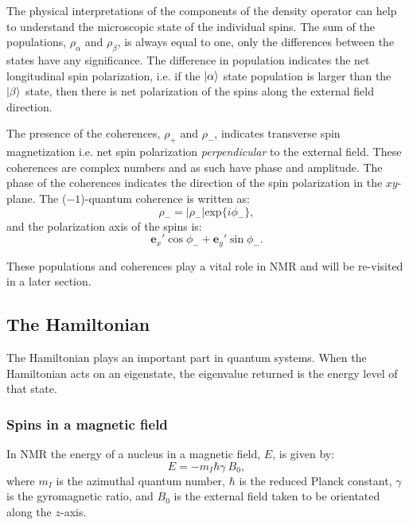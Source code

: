 The physical interpretations of the components of the density operator can help to understand the microscopic state
of the individual spins. The sum of the populations, $\rho_\alpha$ and $\rho_\beta$, is always equal to one, only the differences between the states
have any significance. The difference in population indicates the net longitudinal spin polarization, i.e. if the
$\ket{\alpha}$ state population is larger than the $\ket{\beta}$ state, then there is net polarization of the spins
along the external field direction.

The presence of the coherences, $\rho_+$ and $\rho_-$, indicates transverse spin magnetization i.e. net spin
polarization \textit{perpendicular} to the external field. These coherences are complex numbers and as
such have phase and amplitude. The phase of the coherences indicates the direction of the spin polarization
in the $xy$-plane. The ($-1$)-quantum coherence is written as:
\begin{equation}
  \rho_-= |\rho_-|\text{exp}\{i\phi_-\},
\end{equation}
and the polarization  axis of the spins is:
\begin{equation}
  \mathbf{e}_x'\cos\phi_- + \mathbf{e}_y'\sin\phi_-.
\end{equation}

These populations and coherences play a vital role in NMR and will be re-visited in a later section.

\newpage

\subsection{The Hamiltonian}\label{Hamiltonian}

The Hamiltonian plays an important part in quantum systems. When the Hamiltonian acts on an eigenstate,
the eigenvalue returned is the energy level of that state.

\subsubsection{Spins in a magnetic field}\label{EnergyLevels}

In NMR the energy of a nucleus in a magnetic field, $E$, is given by:
\begin{equation}
  E = -m_I\hbar\gamma~B_0,
\end{equation}
where $m_I$ is the azimuthal quantum number, $\hbar$ is the reduced Planck constant, $\gamma$
is the gyromagnetic ratio, and $B_0$ is the external field taken to be orientated along the $z$-axis.

